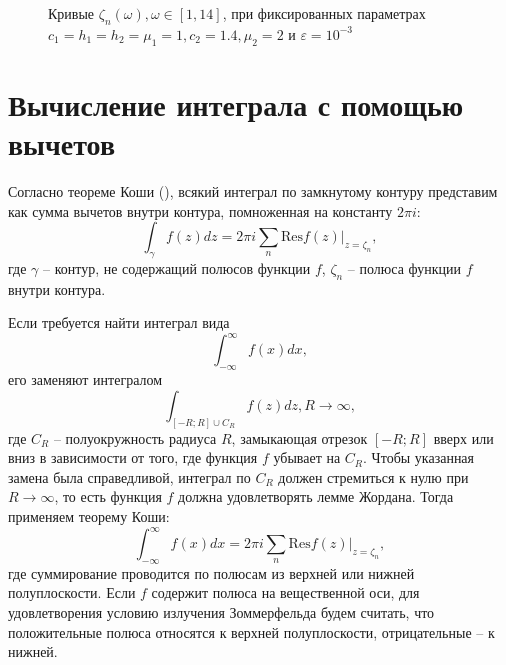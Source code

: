 \documentclass[a4paper, 12pt]{article}
\begin{document}
\begin{figure}[h!]
\noindent{}
\caption{Кривые $\zeta_n(\omega), \omega \in [1,14]$, при фиксированных параметрах $c_1=h_1=h_2=\mu_1=1,c_2=1.4,\mu_2=2$ и $\varepsilon = 10^{-3}$}
\label{figCurves}
\end{figure}

\section{Вычисление интеграла с помощью вычетов}
Согласно теореме Коши (\cite{new,tfkp}), всякий интеграл по замкнутому контуру представим как сумма вычетов внутри контура, помноженная на константу $2\pi i$:
$$\int _{\gamma} f(z) dz = 2\pi i \sum_n \mathrm{Res} f(z)|_{z=\zeta_n},$$
где $\gamma$ -- контур, не содержащий полюсов функции $f$, $\zeta_n$ -- полюса функции $f$ внутри контура.

Если требуется найти интеграл вида $$\int^{\infty}_{-\infty} f(x) dx,$$ его заменяют интегралом $$\int_{[-R;R] \cup C_R} f(z) dz, R \rightarrow \infty,$$ где $C_R$ -- полуокружность радиуса $R$, замыкающая отрезок $[-R;R]$ вверх или вниз в зависимости от того, где функция $f$ убывает на $C_R$. Чтобы указанная замена была справедливой, интеграл по $C_R$ должен стремиться к нулю при $R \rightarrow \infty$, то есть функция $f$ должна удовлетворять лемме Жордана. Тогда применяем теорему Коши:
$$\int^{\infty}_{-\infty} f(x) dx = 2\pi i \sum_n \mathrm{Res} f(z)|_{z=\zeta_n},$$
где суммирование проводится по полюсам из верхней или нижней полуплоскости. Если $f$ содержит полюса на вещественной оси, для удовлетворения условию излучения Зоммерфельда будем считать, что положительные полюса относятся к верхней полуплоскости, отрицательные -- к нижней.
\end{document}
